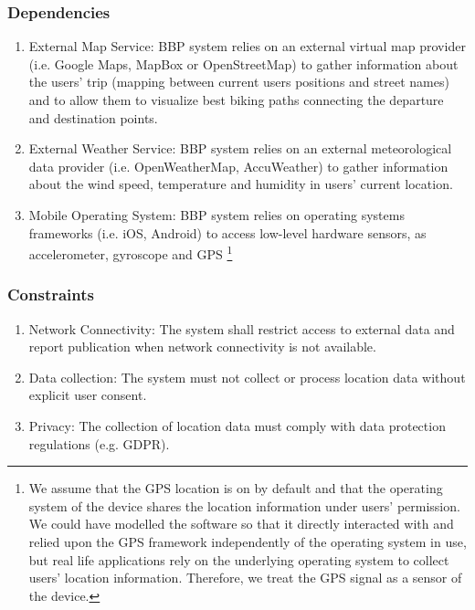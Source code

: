 \subsubsection{Dependencies}
\begin{enumerate}
    \item External Map Service: BBP system relies on an external virtual map provider (i.e. Google Maps, MapBox or OpenStreetMap) to gather information about the users’ trip (mapping between current users positions and street names) and to allow them to visualize best biking paths connecting the departure and destination points.
    \item External Weather Service: BBP system relies on an external meteorological data provider (i.e. OpenWeatherMap, AccuWeather) to gather information about the wind speed, temperature and humidity in users’ current location.
    \item Mobile Operating System: BBP system relies on operating systems frameworks (i.e. iOS, Android) to access low-level hardware sensors, as accelerometer, gyroscope and GPS \footnote{
        We assume that the GPS location is on by default and that the operating system of the device shares the location information under users' permission. We could have modelled the software so that it directly interacted with and relied upon the GPS framework independently of the operating system in use, but real life applications rely on the underlying operating system to collect users' location information. Therefore, we treat the GPS signal as a sensor of the device.
    }
\end{enumerate}

\subsubsection{Constraints}
\begin{enumerate}
    \item Network Connectivity: The system shall restrict access to external data and report publication when network connectivity is not available.
    \item Data collection: The system must not collect or process location data without explicit user consent. 
    \item Privacy: The collection of location data must comply with data protection regulations (e.g. GDPR).
\end{enumerate}

